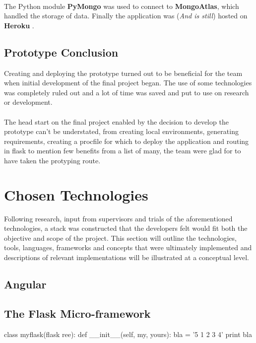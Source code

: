 \paragraph{}
The Python module \textbf{PyMongo} was used to connect to \textbf{MongoAtlas}, which handled the storage of data. Finally the application was (\textit{And is still}) hosted on \textbf{Heroku} \cite{PROTOTYPE_HEROKU}. 

\subsection{Prototype Conclusion}
Creating and deploying the prototype turned out to be beneficial for the team when initial development of the final project began. The use of some technologies was completely ruled out and a lot of time was saved and put to use on research or development. 

\paragraph{}
The head start on the final project enabled by the decision to develop the prototype can't be understated, from creating local environments, generating requirements, creating a procfile for which to deploy the application and routing in flask to mention few benefits from a list of many, the team were glad for to have taken the protyping route.

\section{Chosen Technologies}
Following research, input from supervisors and trials of the aforementioned technologies, a stack was constructed that the developers felt would fit both the objective and scope of the project. This section will outline the technologies, tools, languages, frameworks and concepts that were ultimately implemented and descriptions of relevant implementations will be illustrated at a conceptual level.

\subsection{Angular}
\subsection{The Flask Micro-framework}
\begin{python}
class myflask(flask ree):
    def __init__(self, my, yours):
        bla = '5 1 2 3 4'
        print bla
\end{python}

